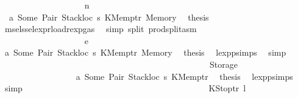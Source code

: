 \begin{isabellebody}
\ \ \ \ \ \ \ \ \ \ \ \ \ \ \ \ \ \ \isamarkupfalse%
\ {\isacharparenleft}{\kern0pt}n\ {\isacharunderscore}{\kern0pt}\ {\isacharunderscore}{\kern0pt}{\isacharparenright}{\kern0pt}\isanewline
\ \ \ \ \ \ \ \ \ \ \ \ \ \ \ \ \ \ \isamarkupfalse%
\ {}\ a{}\ Some\ Pair\ Stackloc\ s{}\ KMemptr\ Memory\ \isamarkupfalse%
\ {\isacharquery}{\kern0pt}thesis\ \isamarkupfalse%
\ msel{\isacharunderscore}{\kern0pt}ssel{\isacharunderscore}{\kern0pt}expr{\isacharunderscore}{\kern0pt}load{\isacharunderscore}{\kern0pt}rexp{\isacharunderscore}{\kern0pt}gas{\isacharparenleft}{\kern0pt}{}{\isacharparenright}{\kern0pt}\ \isamarkupfalse%
\ {\isacharparenleft}{\kern0pt}simp\ split{\isacharcolon}{\kern0pt}\ prod{\isachardot}{\kern0pt}split{\isacharunderscore}{\kern0pt}asm{\isacharparenright}{\kern0pt}\isanewline
\ \ \ \ \ \ \ \ \ \ \ \ \ \ \ \ \isamarkupfalse%
\isanewline
\ \ \ \ \ \ \ \ \ \ \ \ \ \ \ \ \ \ \isamarkupfalse%
\ {\isacharparenleft}{\kern0pt}e\ {\isacharunderscore}{\kern0pt}{\isacharparenright}{\kern0pt}\isanewline
\ \ \ \ \ \ \ \ \ \ \ \ \ \ \ \ \ \ \isamarkupfalse%
\ a{}\ Some\ Pair\ Stackloc\ s{}\ KMemptr\ Memory\ \isamarkupfalse%
\ {\isacharquery}{\kern0pt}thesis\ \isamarkupfalse%
\ lexp{\isachardot}{\kern0pt}psimps{\isacharparenleft}{\kern0pt}{}{\isacharparenright}{\kern0pt}\ \isamarkupfalse%
\ simp\isanewline
\ \ \ \ \ \ \ \ \ \ \ \ \ \ \ \ \isamarkupfalse%
\isanewline
\ \ \ \ \ \ \ \ \ \ \ \ \ \ \isamarkupfalse%
\isanewline
\ \ \ \ \ \ \ \ \ \ \ \ \ \ \ \ \isamarkupfalse%
\ {\isacharparenleft}{\kern0pt}Storage\ {\isacharunderscore}{\kern0pt}{\isacharparenright}{\kern0pt}\isanewline
\ \ \ \ \ \ \ \ \ \ \ \ \ \ \ \ \isamarkupfalse%
\ a{}\ Some\ Pair\ Stackloc\ s{}\ KMemptr\ \isamarkupfalse%
\ {\isacharquery}{\kern0pt}thesis\ \isamarkupfalse%
\ lexp{\isachardot}{\kern0pt}psimps{\isacharparenleft}{\kern0pt}{}{\isacharparenright}{\kern0pt}\ \isamarkupfalse%
\ simp\isanewline
\ \ \ \ \ \ \ \ \ \ \ \ \ \ \isamarkupfalse%
\isanewline
\ \ \ \ \ \ \ \ \ \ \ \ \isamarkupfalse%
\isanewline
\ \ \ \ \ \ \ \ \ \ \ \ \ \ \isamarkupfalse%
\ {\isacharparenleft}{\kern0pt}KStoptr\ l{\isacharprime}{\kern0pt}{\isacharparenright}{\kern0pt}\isanewline

\end{isabellebody}
